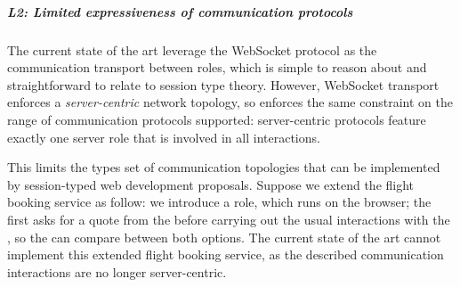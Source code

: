 \subparagraph{L2: 
Limited expressiveness of communication protocols}

The current state of the art leverage the WebSocket protocol
as the communication transport between roles, which is
simple to reason about and straightforward to relate
to session type theory.
However, WebSocket transport enforces a \emph{server-centric}
network topology, so \cite{PureScript2019,MVU2020}
enforces the same constraint on the range of communication
protocols supported:
server-centric protocols feature exactly one server
role that is involved in all interactions. 

This limits the types set of communication topologies
that can be implemented by session-typed web development
proposals. 
Suppose we extend the flight booking service as follow:
we introduce a  role, which
runs on the browser; the  first asks
for a quote from the  before 
carrying out the usual interactions with the ,
so the  can compare between both options.
The current state of the art cannot implement this 
extended flight booking service, as the described
communication interactions are no longer server-centric.